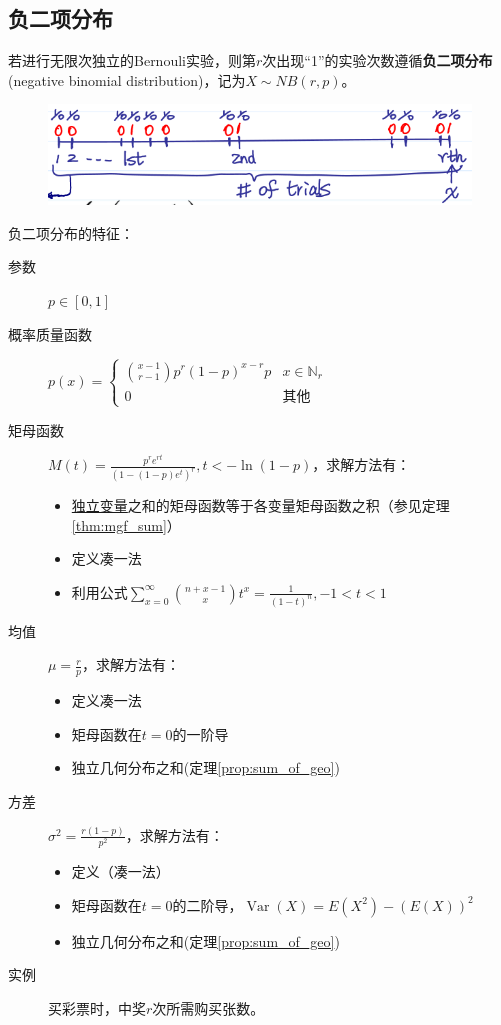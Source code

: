 \subsection{负二项分布}

\begin{definition}
    若进行无限次独立的Bernouli实验，则第$r$次出现“1”的实验次数遵循\textbf{负二项分布}(negative binomial distribution)，记为$X \sim NB(r,p)$。
\end{definition}

\begin{figure}[h]
    \centering
    \includegraphics{image/NB_dist_intu.png}
\end{figure}

负二项分布的特征：
\begin{description}
    \item[参数] $p \in [0,1]$
    \item[概率质量函数] $p(x)=\begin{cases}
                \binom{x-1}{r-1}p^r (1-p)^{x-r} p & x \in \mathbb{N}_r \\
                0                                 & \text{其他}
            \end{cases}$
    \item[矩母函数] $M(t)=\frac{p^r e^{rt}}{(1-(1-p)e^t)^r}, t<-\ln (1-p)$，求解方法有：
        \begin{itemize}
            \item \underline{独立变量}之和的矩母函数等于各变量矩母函数之积（参见定理\ref{thm:mgf_sum}）
            \item 定义凑一法
            \item 利用公式$\sum_{x=0}^{\infty}\binom{n+x-1}{x}t^x=\frac{1}{(1-t)^n},-1<t<1$
        \end{itemize}
    \item[均值] $\mu=\frac{r}{p}$，求解方法有：
        \begin{itemize}
            \item 定义凑一法
            \item 矩母函数在$t=0$的一阶导
            \item 独立几何分布之和(定理\ref{prop:sum_of_geo})
        \end{itemize}
    \item[方差] $\sigma^2=\frac{r(1-p)}{p^2}$，求解方法有：
        \begin{itemize}
            \item 定义（凑一法）
            \item 矩母函数在$t=0$的二阶导，$\operatorname{Var}(X)=E(X^2)-(E(X))^2$
            \item 独立几何分布之和(定理\ref{prop:sum_of_geo})
        \end{itemize}
    \item[实例] 买彩票时，中奖$r$次所需购买张数。
\end{description}

